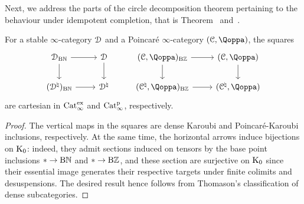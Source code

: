  










Next, we address the parts of the circle decomposition theorem pertaining to the behaviour under idempotent completion, that is Theorem~\; and~.

\begin{lemma}
\label{lemma:S1-natural}%
For a stable $\infty$-category $\mathcal{D}$ and a Poincar\'e $\infty$-category $(\C,\QF)$, the squares
\[
\begin{tikzcd}
\D_{\B\NN} \ar[r] \ar[d] & \D \ar[d] & (\C,\QF)_{\B\ZZ} \ar[r] \ar[d] & (\C,\QF) \ar[d] \\
(\D^{\natural})_{\B\NN} \ar[r] & \D^{\natural} & (\C^\natural,\QF)_{\B\ZZ} \ar[r] & (\C^\natural,\QF)
\end{tikzcd}
\]
are cartesian in $\mathrm{Cat}_\infty^{\mathrm{ex}}$ and $\mathrm{Cat}^{\mathrm p}_\infty$, respectively. 
\end{lemma}
\begin{proof}
The vertical maps in the squares are dense Karoubi and Poincaré-Karoubi inclusions, respectively.
At the same time, the horizontal arrows induce bijections on $\operatorname K_0$: indeed, they admit sections induced on tensors by the base point inclusions $\ast \to \mathrm{B}\mathbb{N}$ and $\ast \to \mathrm{B}\mathbb{Z}$, and these section are surjective on $\operatorname K_0$ since their essential image generates their respective targets under finite colimits and desuspensions.
The desired result hence follows from Thomason's classification of dense subcategories.
\end{proof}





